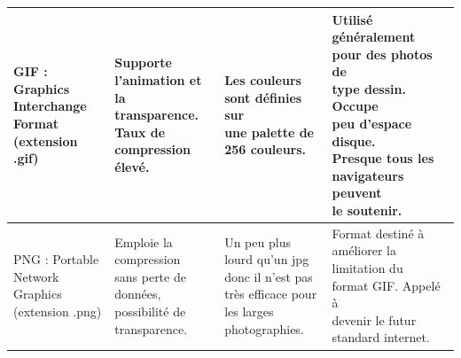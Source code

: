 \begin{table}[H]
\begin{tabular}{|l|l|l|l|}
		\hline
		\makecell{GIF :
			Graphics\\
			Interchange\\
			Format\\
			(extension .gif)}
		& \makecell{Supporte\\
			l'animation et la\\
			transparence.\\
			Taux de\\
			compression\\
			élevé.} 
		& \makecell{Les couleurs\\
			sont définies sur\\
			une palette de\\
			256 couleurs.}
		&  \makecell{Utilisé généralement\\
			pour des photos de\\
			type dessin. Occupe\\
			peu d'espace disque.\\
			Presque tous les\\
			navigateurs peuvent\\
			le soutenir.}   \\
		\hline
		
		\hline
		\makecell{PNG : Portable\\
			Network\\
			Graphics\\
			(extension
			.png)}
		& \makecell{Emploie la\\
			compression\\
			sans perte de\\
			données,\\
			possibilité de\\
			transparence.} 
		& \makecell{Un peu plus\\
			lourd qu’un jpg\\
			donc il n’est pas\\
			très efficace pour\\
			les larges\\
			photographies.}
		&  \makecell{Format destiné à\\
			améliorer la\\
			limitation du\\
			format GIF. Appelé à\\
			devenir le futur\\
			standard internet.}   \\
		\hline
		

\end{tabular}
\end{table}
